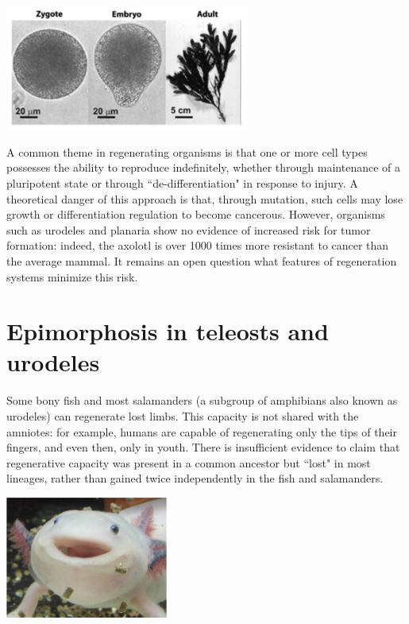 \documentclass{article}
\begin{document}
\begin{center}
\includegraphics[width=0.6\textwidth]{fucus.pdf}
\end{center}

A common theme in regenerating organisms is that one or more cell types possesses the ability to reproduce indefinitely, whether through maintenance of a pluripotent state or through ``de-differentiation" in response to injury. A theoretical danger of this approach is that, through mutation, such cells may lose growth or differentiation regulation to become cancerous. However, organisms such as urodeles and planaria show no evidence of increased risk for tumor formation: indeed, the axolotl is over 1000 times more resistant to cancer than the average mammal. It remains an open question what features of regeneration systems minimize this risk.

\section*{Epimorphosis in teleosts and urodeles}

Some bony fish and most salamanders (a subgroup of amphibians also known as urodeles) can regenerate lost limbs. This capacity is not shared with the amniotes: for example, humans are capable of regenerating only the tips of their fingers, and even then, only in youth. There is insufficient evidence to claim that regenerative capacity was present in a common ancestor but ``lost" in most lineages, rather than gained twice independently in the fish and salamanders.

\begin{center}
\includegraphics[width=0.4\textwidth]{axolotl.pdf}
\end{center}
\end{document}

